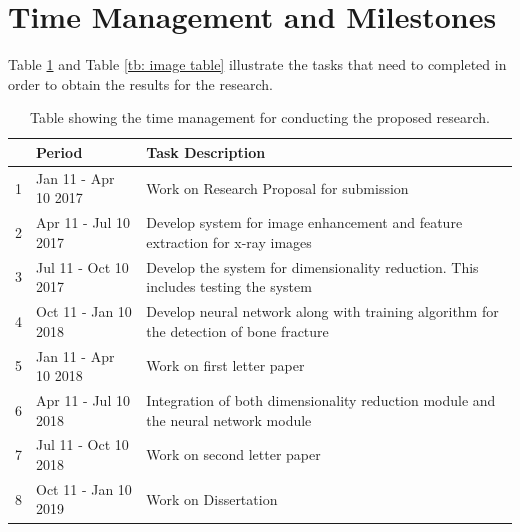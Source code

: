 \documentclass[11pt,twocolumn]{witseiepaper}
\begin{document}
	\section{Time Management and Milestones}
	\label{sc: Time Management and Milestones}
	Table \ref{time_management} and Table \ref{tb: image table} illustrate the tasks that need to completed in order to obtain the results for the research.
	\begin{table}[!h]
		\centering
		\caption{Table showing the time management for conducting the proposed research.}
		\label{time_management}
		\begin{tabular}{| c | p{2.5cm} | p{4.5cm} |}
			\hline
			& Period & Task Description \\
			\hline \hline
			1 & Jan 11 - Apr 10 2017 & Work on Research Proposal for submission\\
			\hline
			2 & Apr 11 - Jul 10 2017 & Develop system for image enhancement and feature extraction for x-ray images \\
			\hline
			3 & Jul 11 - Oct 10 2017 &  Develop the system for dimensionality reduction. This includes testing the system\\
			\hline
			4 & Oct 11 - Jan 10 2018 & Develop neural network along with training algorithm for the detection of bone fracture \\
			\hline
			5 & Jan 11 - Apr 10 2018 & Work on first letter paper \\
			\hline
			6 & Apr 11 - Jul 10 2018 & Integration of both dimensionality reduction module and the neural network module \\
			\hline
			7 & Jul 11 - Oct 10 2018 & Work on second letter paper\\
			\hline
			8 & Oct 11 - Jan 10 2019 & Work on Dissertation \\
			\hline
		\end{tabular}
	\end{table}
	
\end{document}
